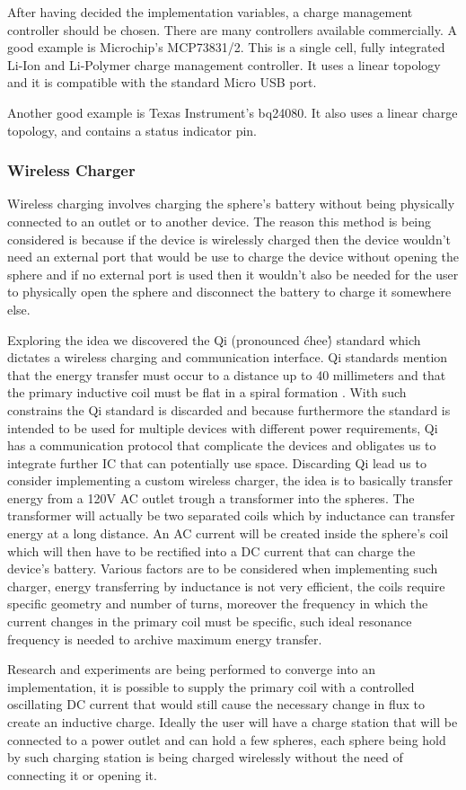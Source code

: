 After having decided the implementation variables, a charge management controller should be chosen. There are many controllers available commercially. A good example is Microchip's MCP73831/2. This is a single cell, fully integrated Li-Ion and Li-Polymer charge management controller. It uses a linear topology and it is compatible with the standard Micro USB port. 

Another good example is Texas Instrument's bq24080. It also uses a linear charge topology, and contains a status indicator pin.
\subsubsection{Wireless Charger}
Wireless charging involves charging the sphere's battery without being physically connected to an outlet or to another device. The reason this method is being considered is because if the device is wirelessly charged then the device wouldn't need an external port that would be use to charge the device without opening the sphere and if no external port is used then it wouldn't also be needed for the user to physically open the sphere and disconnect the battery to charge it somewhere else. 

Exploring the idea we discovered the Qi (pronounced \'chee\') standard which dictates a wireless charging and communication interface. Qi standards mention that the energy transfer must occur to a distance up to 40 millimeters and that the primary inductive coil must be flat in a spiral formation \cite{QiStandard}. With such constrains the Qi standard is discarded and because furthermore the standard is intended to be used for multiple devices with different power requirements, Qi has a communication protocol that complicate the devices and obligates us to integrate further IC that can potentially use space. Discarding Qi lead us to consider implementing a custom wireless charger, the idea is to basically transfer energy from a 120V AC outlet trough a transformer into the spheres. The transformer will actually be two separated coils which by inductance can transfer energy at a long distance. An AC current will be created inside the sphere's coil which will then have to be rectified into a DC current that can charge the device's battery. Various factors are to be considered when implementing such charger, energy transferring by inductance is not very efficient, the coils require specific geometry and number of turns, moreover the frequency in which the current changes in the primary coil must be specific, such ideal resonance frequency is needed to archive maximum energy transfer. 

Research and experiments are being performed to converge into an implementation, it is possible to supply the primary coil with a controlled oscillating DC current that would still cause the necessary change in flux to create an inductive charge. Ideally the user will have a charge station that will be connected to a power outlet and can hold a few spheres, each sphere being hold by such charging station is being charged wirelessly without the need of connecting it or opening it. 
